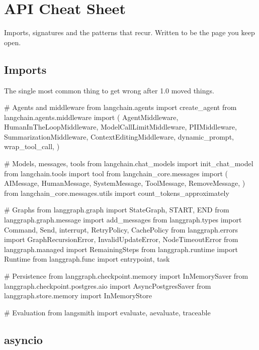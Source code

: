 \chapter{API Cheat Sheet}
\label{app:cheatsheet}

\noindent
Imports, signatures and the patterns that recur. Written to be the page you keep
open.

\section{Imports}
\label{sec:appB-imports}

The single most common thing to get wrong after 1.0 moved things.

\begin{python}[caption={Where everything lives}, label={lst:appB-imports}]
# Agents and middleware
from langchain.agents import create_agent
from langchain.agents.middleware import (
    AgentMiddleware, HumanInTheLoopMiddleware, ModelCallLimitMiddleware,
    PIIMiddleware, SummarizationMiddleware, ContextEditingMiddleware,
    dynamic_prompt, wrap_tool_call,
)

# Models, messages, tools
from langchain.chat_models import init_chat_model
from langchain.tools import tool
from langchain_core.messages import (
    AIMessage, HumanMessage, SystemMessage, ToolMessage, RemoveMessage,
)
from langchain_core.messages.utils import count_tokens_approximately

# Graphs
from langgraph.graph import StateGraph, START, END
from langgraph.graph.message import add_messages
from langgraph.types import Command, Send, interrupt, RetryPolicy, CachePolicy
from langgraph.errors import GraphRecursionError, InvalidUpdateError, NodeTimeoutError
from langgraph.managed import RemainingSteps
from langgraph.runtime import Runtime
from langgraph.func import entrypoint, task

# Persistence
from langgraph.checkpoint.memory import InMemorySaver
from langgraph.checkpoint.postgres.aio import AsyncPostgresSaver
from langgraph.store.memory import InMemoryStore

# Evaluation
from langsmith import evaluate, aevaluate, traceable
\end{python}

\section{asyncio}
\label{sec:appB-asyncio}

